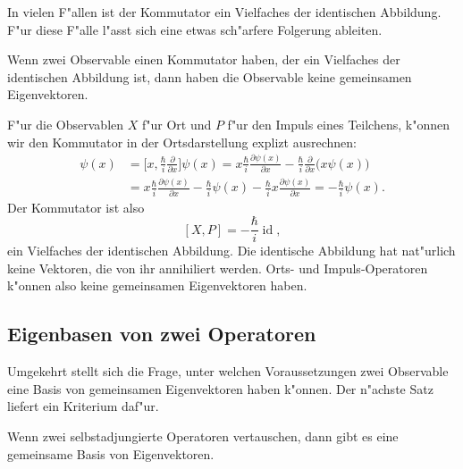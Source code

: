 In vielen F"allen ist der Kommutator ein Vielfaches der identischen
Abbildung. F"ur diese F"alle l"asst sich eine etwas sch"arfere
Folgerung ableiten.

\begin{satz}
Wenn zwei Observable einen Kommutator haben, der ein Vielfaches
der identischen Abbildung ist, dann haben die Observable keine
gemeinsamen Eigenvektoren.
\end{satz}

\begin{beispiel}
F"ur die Observablen $X$ f"ur Ort und $P$ f"ur den Impuls eines Teilchens,
k"onnen wir den Kommutator in der Ortsdarstellung explizt ausrechnen:
\begin{align*}
[X,P]\psi(x)
&=
\biggl[
x,\frac{\hbar}{i}\frac{\partial}{\partial x}
\biggr]\psi(x)
=
x\frac{\hbar}{i}\frac{\partial\psi(x)}{\partial x}
-
\frac{\hbar}{i}\frac{\partial}{\partial x}\bigl(x\psi(x)\bigr)
\\
&=
x\frac{\hbar}{i}\frac{\partial\psi(x)}{\partial x}
-
\frac{\hbar}{i}\psi(x)
-
\frac{\hbar}{i}x\frac{\partial\psi(x)}{\partial x}
=
-\frac{\hbar}{i}\psi(x).
\end{align*}
Der Kommutator ist also
\[
[X,P]=-\frac{\hbar}{i}\operatorname{id},
\]
ein Vielfaches der identischen Abbildung.
Die identische Abbildung hat nat"urlich keine Vektoren, die von ihr
annihiliert werden.
Orts- und Impuls-Operatoren k"onnen also keine gemeinsamen Eigenvektoren
haben.
\end{beispiel}

\subsection{Eigenbasen von zwei Operatoren}
Umgekehrt stellt sich die Frage, unter welchen Voraussetzungen zwei
Observable eine Basis von gemeinsamen Eigenvektoren haben k"onnen.
Der n"achste Satz liefert ein Kriterium daf"ur.

\begin{satz}
\label{skript:kommevbasis}
Wenn zwei selbstadjungierte Operatoren vertauschen, dann gibt es eine
gemeinsame Basis von Eigenvektoren.
\end{satz}

